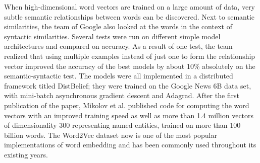 When high-dimensional word vectors are trained on a large amount of data, very subtle semantic relationships between words can be discovered. Next to semantic similarities, the team of Google also looked at the words in the context of syntactic similarities. Several tests were run on different simple model architectures and compared on accuracy. As a result of one test, the team realized that using multiple examples instead of just one to form the relationship vector improved the accuracy of the best models by about 10\% absolutely on the semantic-syntactic test. The models were all implemented in a distributed framework titled DistBelief; they were trained on the Google News 6B data set, with mini-batch asynchronous gradient descent and Adagrad. After the first publication of the paper, Mikolov et al. published code for computing the word vectors with an improved training speed as well as more than 1.4 million vectors of dimensionality 300 representing named entities, trained on more than 100 billion words. The Word2Vec dataset now is one of the most popular implementations of word embedding and has been commonly used throughout its existing years. \\








